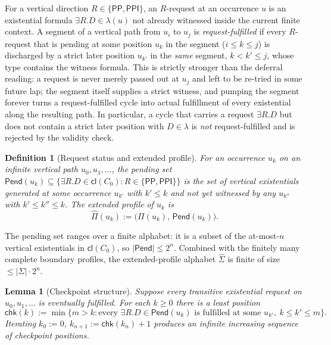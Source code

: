 \documentclass[11pt]{article}
\newtheorem{lemma}[theorem]{Lemma}
\newtheorem{definition}[theorem]{Definition}
\newcommand{\PP}{\mathsf{PP}}
\newcommand{\PPI}{\mathsf{PPI}}
\newcommand{\Cl}{\mathsf{cl}}
\begin{document}
For a vertical direction $R\in\{\PP,\PPI\}$, an $R$-request at an
occurrence $u$ is an existential formula $\exists R.D\in\lambda(u)$
not already witnessed inside the current finite context.  A segment
of a vertical path from $u_i$ to $u_j$ is \emph{request-fulfilled}
if every $R$-request that is pending at some position $u_k$ in the
segment ($i\le k\le j$) is discharged by a strict later position
$u_{k'}$ in the \emph{same} segment, $k<k'\le j$, whose type
contains the witness formula.  This is strictly stronger than the
deferral reading: a request is never merely passed out at $u_j$ and
left to be re-tried in some future lap; the segment itself supplies
a strict witness, and pumping the segment forever turns a
request-fulfilled cycle into actual fulfillment of every
existential along the resulting path.  In particular, a cycle that
carries a request $\exists R.D$ but does not contain a strict later
position with $D\in\lambda$ is \emph{not} request-fulfilled and is
rejected by the validity check.

\begin{definition}[Request status and extended profile]\label{def:request-status}
For an occurrence $u_k$ on an infinite vertical path
$u_0,u_1,\ldots$, the \emph{pending set}
\(
  \mathsf{Pend}(u_k)\subseteq
  \{\exists R.D\in\Cl(C_0):R\in\{\PP,\PPI\}\}
\)
is the set of vertical existentials generated at some occurrence
$u_{k'}$ with $k'\le k$ and not yet witnessed by any
$u_{k''}$ with $k'\le k''\le k$.  The \emph{extended profile} of
$u_k$ is
\[
  \widehat\Pi(u_k):=\bigl(\Pi(u_k),\,\mathsf{Pend}(u_k)\bigr).
\]
\end{definition}

The pending set ranges over a finite alphabet: it is a subset of the
at-most-$n$ vertical existentials in $\Cl(C_0)$, so
$|\mathsf{Pend}|\le 2^{n}$.  Combined with the finitely many complete
boundary profiles, the extended-profile alphabet $\widehat\Sigma$ is
finite of size $\le |\Sigma|\cdot 2^n$.

\begin{lemma}[Checkpoint structure]\label{lem:checkpoints}
Suppose every transitive existential request on
$u_0,u_1,\ldots$ is eventually fulfilled.  For each $k\ge 0$ there is
a least position
\[
  \mathsf{chk}(k):=\min\{m>k:\text{every }\exists R.D\in\mathsf{Pend}(u_k)
                          \text{ is fulfilled at some }u_{k'},\ k\le k'\le m\}.
\]
Iterating $k_0:=0$, $k_{n+1}:=\mathsf{chk}(k_n)+1$ produces an
infinite increasing sequence of checkpoint positions.
\end{lemma}
\end{document}
